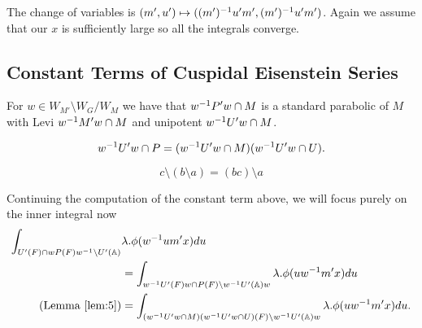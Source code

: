    The change of variables is \((m', u') \mapsto ((m')^{-1} u' m', (m')^{-1} u' m')\).
    Again we assume that our $x$ is sufficiently large so all the integrals converge.

\subsection{Constant Terms of Cuspidal Eisenstein Series}
\begin{Lemma}\label{lem:4}
        For \(w\in W_{M'}\setminus W_G / W_{M} \) we have that \(w^{-1} P'w\cap M\) is a standard parabolic of \(M\) with Levi \(w^{-1} M'w\cap M\) and unipotent \(w^{-1} U'w\cap M\).
    \end{Lemma}
    \begin{Lemma}\label{lem:5}
        \[w^{-1} U' w \cap P = (w^{-1} U' w \cap M)(w^{-1} U' w \cap U).\]
    \end{Lemma}
    \begin{Lemma}\label{lem:6}
        \[c\setminus (b\setminus a )= (bc)\setminus a\]
    \end{Lemma}
    Continuing the computation of the constant term above, we will focus purely on the inner integral now
    \begin{equation*}
        \begin{aligned}
            \int_{U'(F)\cap wP(F)w\inv \setminus U'(\A)}& \lambda.\phi( w\inv um' x)  du \\&= \int_{w\inv U'(F)w \cap P(F) \setminus w\inv U'(\A)w} \lambda.\phi( uw\inv m' x)  du \\
            (\text{Lemma \ref{lem:5}})&= \int_{(w\inv U' w \cap M)(w\inv U' w \cap U)(F) \setminus w\inv U'(\A)w} \lambda.\phi( uw\inv m' x)  du . \\
        \end{aligned}
    \end{equation*}
